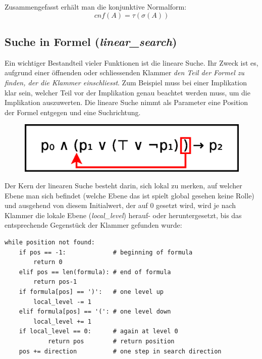 \documentclass[11pt,a4paper,ngerman]{scrreprt}
\begin{document}
Zusammengefasst erhält man die konjunktive Normalform:
\begin{equation}
cnf(A) = \tau(\sigma(A))
\end{equation}

\subsection{Suche in Formel (\textit{linear\_search})}
\label{section:linear_search}
Ein wichtiger Bestandteil vieler Funktionen ist die lineare Suche. Ihr Zweck ist es, aufgrund einer öffnenden oder schliessenden Klammer \textit{den Teil der Formel zu finden, der die Klammer einschliesst}. Zum Beispiel muss bei einer Implikation klar sein, welcher Teil vor der Implikation genau beachtet werden muss, um die Implikation auszuwerten. Die lineare Suche nimmt als Parameter eine Position der Formel entgegen und eine Suchrichtung.
\begin{figure}[ht]
\centering
\includegraphics[width=.5\linewidth]{pics/linear_search.eps}
\end{figure}
Der Kern der linearen Suche besteht darin, sich lokal zu merken, auf welcher Ebene man sich befindet (welche Ebene das ist spielt global gesehen keine Rolle) und ausgehend von diesem Initialwert, der auf 0 gesetzt wird, wird je nach Klammer die lokale Ebene (\textit{local\_level}) herauf- oder heruntergesetzt, bis das entsprechende Gegenstück der Klammer gefunden wurde:
\begin{lstlisting}
while position not found:
    if pos == -1:             # beginning of formula
        return 0
    elif pos == len(formula): # end of formula
        return pos-1
    if formula[pos] == ')':   # one level up
        local_level -= 1
    elif formula[pos] == '(': # one level down
        local_level += 1
    if local_level == 0:      # again at level 0
            return pos        # return position
    pos += direction          # one step in search direction
\end{lstlisting}
\end{document}
